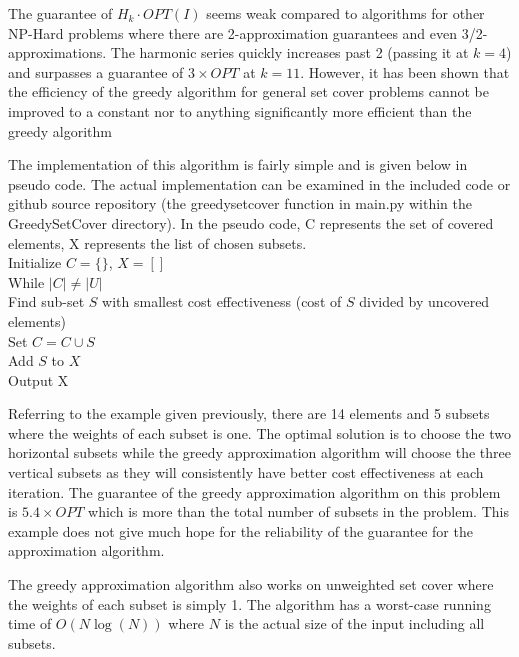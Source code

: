 The guarantee of $H_k\cdot OPT(I)$ seems weak compared to algorithms for other NP-Hard problems where there are 2-approximation guarantees and even 3/2-approximations. The harmonic series quickly increases past 2 (passing it at $k=4$) and surpasses a guarantee of $3\times OPT$ at $k=11$. However, it has been shown that the efficiency of the greedy algorithm for general set cover problems cannot be improved to a constant nor to anything significantly more efficient than the greedy algorithm %

The implementation of this algorithm is fairly simple and is given below in pseudo code. The actual implementation can be examined in the included code or github source repository (the greedy\textunderscore set\textunderscore cover function in main.py within the GreedySetCover directory). In the pseudo code, C represents the set of covered elements, X represents the list of chosen subsets.\\
Initialize $C=\{\}$, $X=[]$\\
While $|C| \neq |U|$\\
Find sub-set $S$ with smallest cost effectiveness (cost of $S$ divided by uncovered elements)\\
Set $C=C \cup S$\\
Add $S$ to $X$\\
Output X

Referring to the example given previously, there are 14 elements and 5 subsets where the weights of each subset is one. The optimal solution is to choose the two horizontal subsets while the greedy approximation algorithm will choose the three vertical subsets as they will consistently have better cost effectiveness at each iteration. The guarantee of the greedy approximation algorithm on this problem is $5.4\times OPT$ which is more than the total number of subsets in the problem. This example does not give much hope for the reliability of the guarantee for the approximation algorithm.

The greedy approximation algorithm also works on unweighted set cover where the weights of each subset is simply 1. The algorithm has a worst-case running time of $O(N\log(N))$ where $N$ is the actual size of the input including all subsets.

